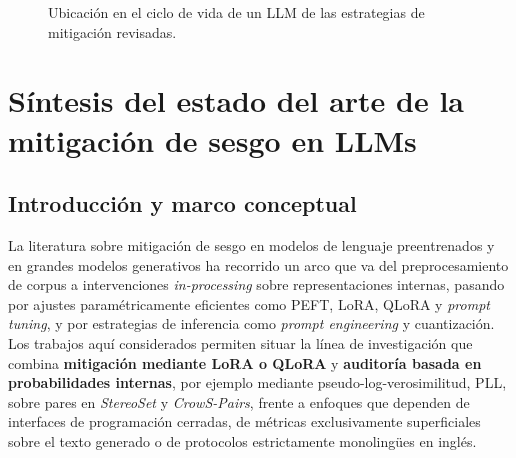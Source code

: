 \documentclass[12pt,a4paper]{report}
\begin{document}
\begin{figure}[H]
{%
    }
    \caption{Ubicación en el ciclo de vida de un LLM de las estrategias de mitigación revisadas.}
    \label{fig:mitigacion_pipeline}
\end{figure}

\section{Síntesis del estado del arte de la mitigación de sesgo en LLMs}
\label{sec:comparativa_trabajos_recientes}
\sloppy


\subsection{Introducción y marco conceptual}
\label{subsec:sintesis_intro_marco}

La literatura sobre mitigación de sesgo en modelos de lenguaje preentrenados y en grandes modelos generativos ha recorrido un arco que va del preprocesamiento de corpus a intervenciones \emph{in-processing} sobre representaciones internas, pasando por ajustes paramétricamente eficientes como PEFT, LoRA, QLoRA y \textit{prompt tuning}, y por estrategias de inferencia como \textit{prompt engineering} y cuantización. Los trabajos aquí considerados permiten situar la línea de investigación que combina \textbf{mitigación mediante LoRA o QLoRA} y \textbf{auditoría basada en probabilidades internas}, por ejemplo mediante pseudo-log-verosimilitud, PLL, sobre pares en \textit{StereoSet} y \textit{CrowS-Pairs}, frente a enfoques que dependen de interfaces de programación cerradas, de métricas exclusivamente superficiales sobre el texto generado o de protocolos estrictamente monolingües en inglés.
\end{document}
